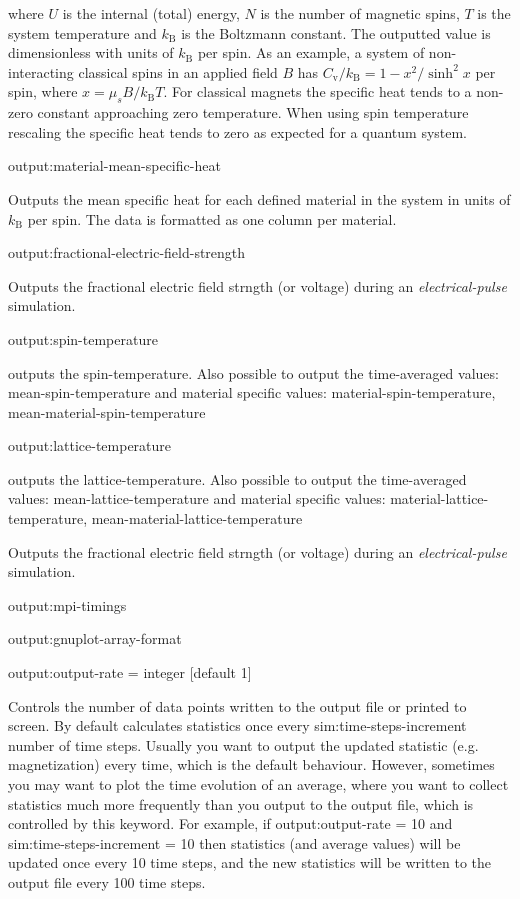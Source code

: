 \noindent where $U$ is the internal (total) energy, $N$ is the number of magnetic spins, $T$ is the system temperature and $k_{\mathrm{B}}$ is the Boltzmann constant. The outputted value is dimensionless with units of $k_{\mathrm{B}}$ per spin. As an example, a system of non-interacting classical spins in an applied field $B$ has $C_{\mathrm{v}}/k_{\mathrm{B}} = 1 - x^2/\sinh^2 x$ per spin, where $x = \mu_s B / k_{\mathrm{B}} T$. For classical magnets the specific heat tends to a non-zero constant approaching zero temperature. When using spin temperature rescaling the specific heat tends to zero as expected for a quantum system.

{\zicf output:material-mean-specific-heat} Outputs the mean specific heat for each defined material in the system in units of $k_{\mathrm{B}}$ per spin. The data is formatted as one column per material.

{\zicf output:fractional-electric-field-strength}
Outputs the fractional electric field strngth (or voltage) during an \textit{electrical-pulse} simulation.


{\zicf output:spin-temperature} outputs the spin-temperature. Also possible to output the time-averaged values: mean-spin-temperature and material specific values: material-spin-temperature, mean-material-spin-temperature

{\zicf output:lattice-temperature} outputs the lattice-temperature. Also possible to output the time-averaged values: mean-lattice-temperature and material specific values: material-lattice-temperature, mean-material-lattice-temperature



Outputs the fractional electric field strngth (or voltage) during an \textit{electrical-pulse} simulation.

{\zicf output:mpi-timings}

{\zicf output:gnuplot-array-format}

{\zicf output:output-rate = integer [default 1]} Controls the number of data points written to the output file or printed to screen. By default \vampire calculates statistics once every sim:time-steps-increment number of time steps. Usually you want to output the updated statistic (e.g. magnetization) every time, which is the default behaviour. However, sometimes you may want to plot the time evolution of an average, where you want to collect statistics much more frequently than you output to the output file, which is controlled by this keyword. For example, if output:output-rate = 10 and sim:time-steps-increment = 10 then statistics (and average values) will be updated once every 10 time steps, and the new statistics will be written to the output file every 100 time steps.

